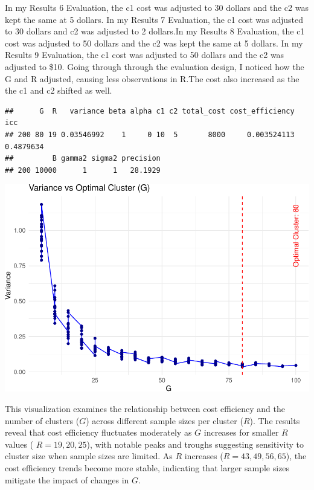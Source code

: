 \documentclass[
]{article}
\begin{document}
In my Results 6 Evaluation, the c1 cost was adjusted to 30 dollars and
the c2 was kept the same at 5 dollars. In my Results 7 Evaluation, the
c1 cost was adjusted to 30 dollars and c2 was adjusted to 2 dollars.In
my Results 8 Evaluation, the c1 cost was adjusted to 50 dollars and the
c2 was kept the same at 5 dollars. In my Results 9 Evaluation, the c1
cost was adjusted to 50 dollars and the c2 was adjusted to \$10. Going
through through the evaluation design, I noticed how the G and R
adjusted, causing less observations in R.The cost also increased as the
the c1 and c2 shifted as well.

\begin{verbatim}
##      G  R   variance beta alpha c1 c2 total_cost cost_efficiency       icc
## 200 80 19 0.03546992    1     0 10  5       8000     0.003524113 0.4879634
##         B gamma2 sigma2 precision
## 200 10000      1      1   28.1929
\end{verbatim}

\begin{center}\includegraphics{Project3Simulation_files/figure-latex/unnamed-chunk-16-1} \end{center}

This visualization examines the relationship between cost efficiency and
the number of clusters (\(G\)) across different sample sizes per cluster
(\(R\)). The results reveal that cost efficiency fluctuates moderately
as \(G\) increases for smaller \(R\) values ( \(R = 19, 20, 25\)), with
notable peaks and troughs suggesting sensitivity to cluster size when
sample sizes are limited. As \(R\) increases (\(R = 43, 49, 56, 65\)),
the cost efficiency trends become more stable, indicating that larger
sample sizes mitigate the impact of changes in \(G\).
\end{document}
